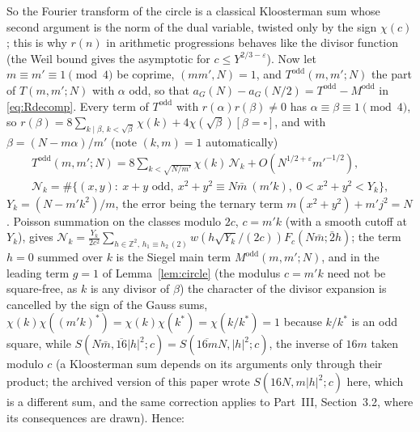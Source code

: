 ﻿\documentclass[11pt]{amsart}
\theoremstyle{remark}
\newcommand{\Z}{\mathbb{Z}}
\newcommand{\e}{\varepsilon}
\begin{document}
So the Fourier transform of the circle is a classical Kloosterman sum whose second argument is the norm of the dual variable, twisted only by the sign $\chi(c)$; this is why $r(n)$ in arithmetic progressions behaves like the divisor function (the Weil bound gives the asymptotic for $c\le Y^{2/3-\e}$). Now let $m\equiv m'\equiv1\pmod4$ be coprime, $(mm',N)=1$, and $T^{\mathrm{odd}}(m,m';N)$ the part of $T(m,m';N)$ with $\alpha$ odd, so that $a_G(N)-a_G(N/2)=T^{\mathrm{odd}}-M^{\mathrm{odd}}$ in \eqref{eq:Rdecomp}. Every term of $T^{\mathrm{odd}}$ with $r(\alpha)r(\beta)\ne0$ has $\alpha\equiv\beta\equiv1\pmod 4$, so $r(\beta)=8\sum_{k\mid\beta,\,k<\sqrt\beta}\chi(k)+4\chi(\sqrt\beta)[\beta=\square]$, and with $\beta=(N-m\alpha)/m'$ (note $(k,m)=1$ automatically)
\begin{gather*}
T^{\mathrm{odd}}(m,m';N)=8\sum_{k<\sqrt{N/m'}}\chi(k)\,\mathcal N_k+O(N^{1/2+\e}m'^{-1/2}),\\
\mathcal N_k=\#\bigl\{(x,y):\ x+y\text{ odd},\ x^2+y^2\equiv N\bar m\ (m'k),\ 0<x^2+y^2<Y_k\bigr\},
\end{gather*}
$Y_k=(N-m'k^2)/m$, the error being the ternary term $m(x^2+y^2)+m'j^2=N$. Poisson summation on the classes modulo $2c$, $c=m'k$ (with a smooth cutoff at $Y_k$), gives $\mathcal N_k=\frac{Y_k}{2c^2}\sum_{h\in\Z^2,\,h_1\equiv h_2\,(2)}\hat w(h\sqrt{Y_k}/(2c))F_c(N\bar m;\bar2h)$; the term $h=0$ summed over $k$ is the Siegel main term $M^{\mathrm{odd}}(m,m';N)$, and in the leading term $g=1$ of Lemma~\ref{lem:circle} (the modulus $c=m'k$ need not be square-free, as $k$ is any divisor of $\beta$) the character of the divisor expansion is cancelled by the sign of the Gauss sums, $\chi(k)\chi((m'k)^{*})=\chi(k)\chi(k^{*})=\chi(k/k^{*})=1$ because $k/k^{*}$ is an odd square, while $S(N\bar m,\overline{16}|h|^2;c)=S(\overline{16m}N,|h|^2;c)$, the inverse of $16m$ taken modulo $c$ (a Kloosterman sum depends on its arguments only through their product; the archived version of this paper wrote $S(16N,m|h|^2;c)$ here, which is a different sum, and the same correction applies to Part~III, Section~3.2, where its consequences are drawn). Hence:
\end{document}
